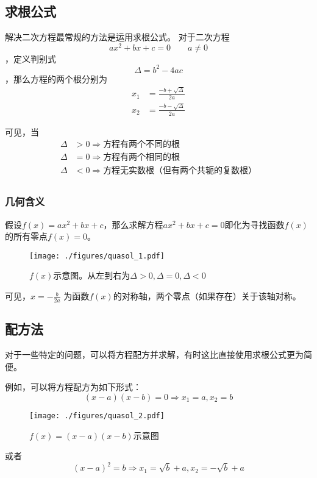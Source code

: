 
\subsection{求根公式}
解决二次方程最常规的方法是运用求根公式。
对于二次方程$$ax^2+bx+c=0 \qquad a\neq 0$$，定义判别式$$\Delta = b^2-4ac$$，那么方程的两个根分别为$$
\begin{aligned}
x_1&=\frac{-b+\sqrt{\Delta}}{2a}\\
x_2&=\frac{-b-\sqrt{\Delta}}{2a}
\end{aligned}
$$

可见，当
$$
\begin{aligned}
\Delta &> 0 \Rightarrow \text{方程有两个不同的根}\\
\Delta &= 0 \Rightarrow \text{方程有两个相同的根}\\
\Delta &< 0 \Rightarrow \text{方程无实数根（但有两个共轭的复数根）}\\
\end{aligned}
$$

\subsubsection{几何含义}
假设$f(x)=ax^2+bx+c$，那么求解方程$ax^2+bx+c=0$即化为寻找函数$f(x)$的所有零点$f(x)=0$。
\begin{figure}[ht]
\centering
\texttt{[image: ./figures/quasol\_1.pdf]}
\caption{$f(x)$示意图。从左到右为$\Delta > 0, \Delta = 0, \Delta < 0$} \label{quasol_fig1}
\end{figure}
可见，$x=-\frac{b}{2a}$ 为函数$f(x)$的对称轴，两个零点（如果存在）关于该轴对称。

\subsection{配方法}
对于一些特定的问题，可以将方程配方并求解，有时这比直接使用求根公式更为简便。

例如，可以将方程配方为如下形式：
$$(x-a)(x-b)=0\Rightarrow x_1=a, x_2=b$$
\begin{figure}[ht]
\centering
\texttt{[image: ./figures/quasol\_2.pdf]}
\caption{$f(x)=(x-a)(x-b)$示意图} \label{quasol_fig2}
\end{figure}

或者
$$(x-a)^2=b\Rightarrow x_1=\sqrt{b}+a, x_2=-\sqrt{b}+a$$
